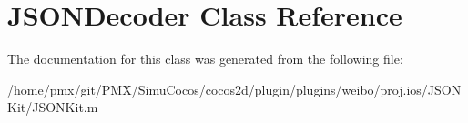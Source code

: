 \hypertarget{classJSONDecoder}{}\section{J\+S\+O\+N\+Decoder Class Reference}
\label{classJSONDecoder}


The documentation for this class was generated from the following file\+:\begin{DoxyCompactItemize}
\item 
/home/pmx/git/\+P\+M\+X/\+Simu\+Cocos/cocos2d/plugin/plugins/weibo/proj.\+ios/\+J\+S\+O\+N\+Kit/J\+S\+O\+N\+Kit.\+m\end{DoxyCompactItemize}
